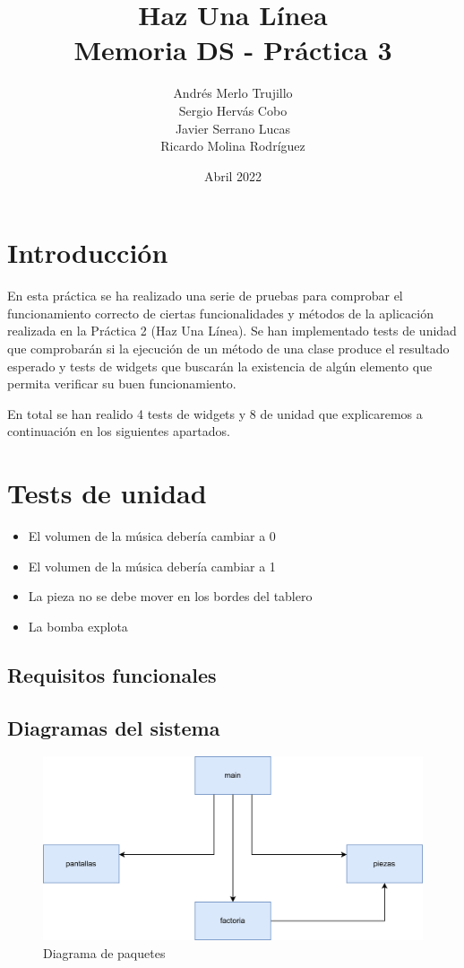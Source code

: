 \documentclass{article}
\title{Haz Una Línea\\
\large Memoria DS - Práctica 3}
\author{Andrés Merlo Trujillo\\ Sergio Hervás Cobo\\ Javier Serrano Lucas\\ Ricardo Molina Rodríguez}
\begin{document}
\date{Abril 2022}
\maketitle
\section{Introducción}
En esta práctica se ha realizado una serie de pruebas para comprobar el funcionamiento correcto de
ciertas funcionalidades y métodos de la aplicación realizada en la Práctica 2 (Haz Una Línea). Se han implementado
tests de unidad que comprobarán si la ejecución de un método de una clase produce el resultado
esperado y tests de widgets que buscarán la existencia de algún elemento que permita verificar su buen funcionamiento.

En total se han realido 4 tests de widgets y 8 de unidad que explicaremos a continuación en los siguientes apartados.


\section{Tests de unidad}
\begin{itemize}
\item El volumen de la música debería cambiar a 0
\item El volumen de la música debería cambiar a 1
\item La pieza no se debe mover en los bordes del tablero
\item La bomba explota

\end{itemize}


\subsection{Requisitos funcionales}

\subsection{Diagramas del sistema}
\begin{figure}[H]
        \includegraphics[width=\textwidth]{imagenes/paquetes.png}
        \caption{Diagrama de paquetes}
\end{figure}
\end{document}
